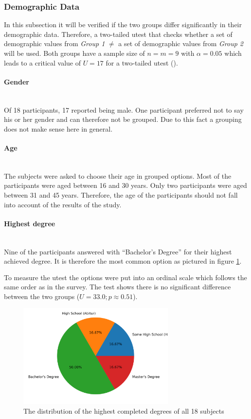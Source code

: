 \label{results}
\subsubsection{Demographic Data}
\label{sec:demo}
In this subsection it will be verified if the two groups differ significantly in their demographic data. 
Therefore, a two-tailed \gls{utest} that checks whether a set of demographic values from \textit{Group 1} $\neq$  a set of demographic values from \textit{Group 2} will be used.
Both groups have a sample size of $n = m = 9 $ with $\alpha = 0.05$ which leads to a critical value of $U = 17$ for a two-tailed \gls{utest} (\cite{zar2010biostatistical}).

\paragraph{Gender}\mbox{}\\
Of 18 participants, 17 reported being male. 
One participant preferred not to say his or her gender and can therefore not be grouped.
Due to this fact a grouping does not make sense here in general. 

\paragraph{Age}\mbox{}\\
The subjects were asked to choose their age in grouped options. 
Most of the participants were aged between 16 and 30 years.
Only two participants were aged between 31 and 45 years. 
Therefore, the age of the participants should not fall into account of the results of the study.

\paragraph{Highest degree}\mbox{}\\
Nine of the participants answered with \enquote{Bachelor's Degree} for their highest achieved degree. 
It is therefore the most common option as pictured in figure \ref{fig:degree}.

To measure the \gls{utest} the options were put into an ordinal scale which follows the same order as in the survey.
The test shows there is no significant difference between the two groups ($U = 33.0; p \approx 0.51$).

\begin{figure}[H]
  \centering
  \includegraphics[width=0.7\textwidth]{Evaluation/img/degree.png}
  \caption{The distribution of the highest completed degrees of all 18 subjects}\label{fig:degree}
\end{figure}

